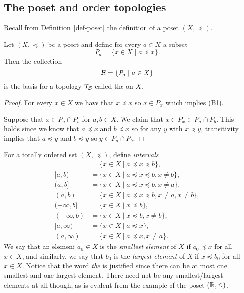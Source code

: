 \subsection{The poset and order topologies}
Recall from Definition~\ref{def-poset} the definition of a poset $(X,\preceq)$.
\begin{prop}
  \label{poset-top-def}
  Let $(X,\preceq)$ be a poset and define for every $a \in X$ a subset
  \[
    P_a = \{ x \in X \mid a \preceq x\}.
  \]
  Then the collection
  \[
    \mathcal{B} = \{ P_a \mid a \in X \}
  \]
  is the basis for a topology $\mathcal{T}_{\mathcal{B}}$ called the  on $X$.
\end{prop}
\begin{proof}
  For every $x \in X$ we have that $x \preceq x$ so $x \in P_x$ which implies (B1).
  
  Suppose that $x \in P_a \cap P_b$ for $a,b \in X$. We claim that $x \in P_x \subset P_a \cap P_b$. This holds since we know that $a \preceq x$ and $b \preceq x$ so for any $y$ with $x \preceq y$, transitivity implies that $a \preceq y$ and $b \preceq y$ so $y \in P_a \cap P_b$.
\end{proof}
For a totally ordered set $(X,\preceq)$, define \emph{intervals}
\begin{align*}
  [a,b] &= \{ x \in X \mid a \preceq x \preceq b \},\\
  [a,b) &= \{ x \in X \mid a \preceq x \preceq b, x \not= b \},\\
  (a,b] &= \{ x \in X \mid a \preceq x \preceq b, x \not= a \},\\
  (a,b) &= \{ x \in X \mid a \preceq x \preceq b, x\not= a, x \not= b \},\\
  (-\infty,b] &= \{ x \in X \mid x \preceq b \},\\
  (-\infty,b) &= \{ x \in X \mid x \preceq b, x \not= b \},\\
  [a,\infty) &= \{ x \in X \mid a \preceq x \},\\
  (a,\infty) &= \{ x \in X \mid a \preceq x, x \not= a \}.
\end{align*}
We say that an element $a_0 \in X$ is the \emph{smallest element} of $X$ if $a_0 \preceq x$ for all $x \in X$, and similarly, we say that $b_0$ is the \emph{largest element} of $X$ if $x \preceq b_0$ for all $x \in X$. Notice that the word \emph{the} is justified since there can be at most one smallest and one largest element. There need not be any smallest/largest elements at all though, as is evident from the example of the poset $(\mathbb{R},\leq)$.
